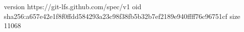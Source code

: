 version https://git-lfs.github.com/spec/v1
oid sha256:a657e42e1f8f0ffdd584293a23c98f38fb5b32b7ef2189e940ffff76c96751cf
size 11068
